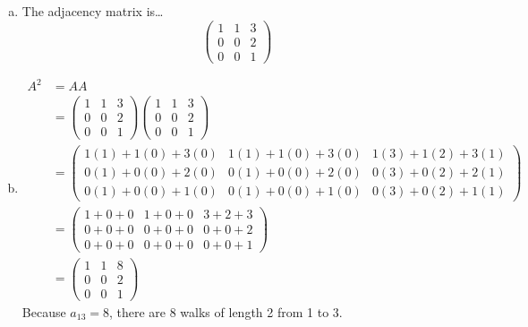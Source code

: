 \documentclass[12pt,letterpaper]{exam}
\begin{document}
\begin{questions}
\sol 
\begin{enumerate}[(a)]
\item The adjacency matrix is\dots
	\[
	\begin{pmatrix}
	1 & 1 & 3 \\
	0 & 0 & 2 \\
	0 & 0 & 1
	\end{pmatrix}
	\] \pspace

\item 
	\[
	\begin{aligned}
	A^2&= AA \\[0.3cm]
	&= \begin{pmatrix}
	1 & 1 & 3 \\
	0 & 0 & 2 \\
	0 & 0 & 1
	\end{pmatrix}
	\begin{pmatrix}
	1 & 1 & 3 \\
	0 & 0 & 2 \\
	0 & 0 & 1
	\end{pmatrix} \\[0.3cm]
	&= \begin{pmatrix}
	1(1) + 1(0) + 3(0) & 1(1) + 1(0) + 3(0) & 1(3) + 1(2) + 3(1) \\
	0(1) + 0(0) + 2(0) & 0(1) + 0(0) + 2(0) & 0(3) + 0(2) + 2(1)  \\
	0(1) + 0(0) + 1(0) & 0(1) + 0(0) + 1(0) & 0(3) + 0(2) + 1(1) 
	\end{pmatrix} \\[0.3cm]
	&= \begin{pmatrix}
	1 + 0 + 0 & 1 + 0 + 0 & 3 + 2 + 3 \\
	0 + 0 + 0 & 0 + 0 + 0 & 0 + 0 + 2 \\
	0 + 0 + 0 & 0 + 0 + 0 & 0 + 0 + 1 
	\end{pmatrix} \\[0.3cm]
	&= \begin{pmatrix}
	1 & 1 & 8 \\
	0 & 0 & 2 \\
	0 & 0 & 1
	\end{pmatrix}
	\end{aligned}
	\]
Because $a_{13}= 8$, there are 8 walks of length 2 from 1 to 3. 
\end{enumerate}


\end{questions}
\end{document}
